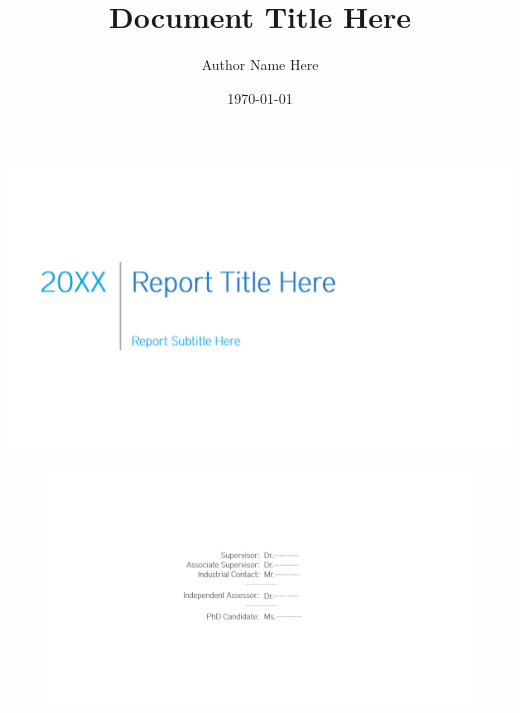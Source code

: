 \documentclass[pdftex,12pt,a4paper]{article}
\author{Author Name Here}
\title{Document Title Here}
\date{\today}	%
\begin{document}
\begin{center}

\vspace*{65mm}	%
\includegraphics[scale=0.45]{Images/ReportCoverLogo}	%

\begin{figure}[b]	%
	\centering
	\includegraphics[scale=0.6]{Images/Supervisors}
	\label{fig:Supervisors}	%
\end{figure}

\end{center}

\thispagestyle{empty}	%

\newpage
\end{document}
